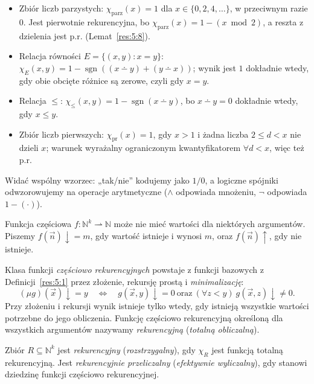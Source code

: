\begin{przyklad}\label{res:5:4}
\begin{itemize}
\item Zbiór liczb parzystych: $\chi_{\mathrm{parz}}(x)=1$ dla $x\in\{0,2,4,\ldots\}$, w przeciwnym razie $0$. Jest pierwotnie rekurencyjna, bo $\chi_{\mathrm{parz}}(x)=1-(x\bmod 2)$, a reszta z dzielenia jest p.r. (Lemat~\ref{res:5:8}).
\item Relacja równości $E=\{(x,y):x=y\}$: $\chi_E(x,y)=1-\operatorname{sgn}((x\dotminus y)+(y\dotminus x))$; wynik jest $1$ dokładnie wtedy, gdy obie obcięte różnice są zerowe, czyli gdy $x=y$.
\item Relacja $\le$: $\chi_{\le}(x,y)=1-\operatorname{sgn}(x\dotminus y)$, bo $x\dotminus y=0$ dokładnie wtedy, gdy $x\le y$.
\item Zbiór liczb pierwszych: $\chi_{\mathrm{pr}}(x)=1$, gdy $x>1$ i żadna liczba $2\le d<x$ nie dzieli $x$; warunek wyrażalny ograniczonym kwantyfikatorem $\forall d<x$, więc też p.r.
\end{itemize}
Widać wspólny wzorzec: „tak/nie” kodujemy jako $1/0$, a logiczne spójniki odwzorowujemy na operacje arytmetyczne ($\land$ odpowiada mnożeniu, $\neg$ odpowiada $1-(\cdot)$).
\end{przyklad}

\begin{definicja}\label{res:5:5}
Funkcja częściowa $f:\mathbb N^k\rightharpoonup\mathbb N$ może nie mieć wartości dla niektórych argumentów. Piszemy $f(\vec n)\downarrow=m$, gdy wartość istnieje i wynosi $m$, oraz $f(\vec n)\uparrow$, gdy nie istnieje.

Klasa funkcji \emph{częściowo rekurencyjnych} powstaje z funkcji bazowych z Definicji~\ref{res:5:1} przez złożenie, rekursję prostą i \emph{minimalizację}:
\[
(\mu g)(\vec x)\downarrow=y\quad\Longleftrightarrow\quad
g(\vec x,y)\downarrow=0\ \text{oraz}\ (\forall z<y)\ g(\vec x,z)\downarrow\ne0.
\]
Przy złożeniu i rekursji wynik istnieje tylko wtedy, gdy istnieją wszystkie wartości potrzebne do jego obliczenia. Funkcję częściowo rekurencyjną określoną dla wszystkich argumentów nazywamy \emph{rekurencyjną} (\emph{totalną obliczalną}).

Zbiór $R\subseteq\mathbb N^k$ jest \emph{rekurencyjny} (\emph{rozstrzygalny}), gdy $\chi_R$ jest funkcją totalną rekurencyjną. Jest \emph{rekurencyjnie przeliczalny} (\emph{efektywnie wyliczalny}), gdy stanowi dziedzinę funkcji częściowo rekurencyjnej.
\end{definicja}

